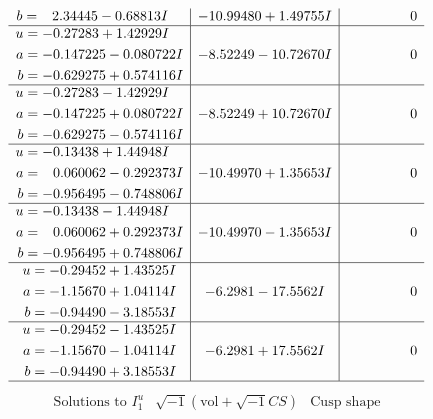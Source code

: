 \documentclass[1p]{elsarticle_modified}
\theoremstyle{definition}
\newcommand{\I}{\sqrt{-1}}
\begin{document}
$$\begin{array}{c|c|c}
\begin{aligned}
b &= \phantom{-}2.34445 - 0.68813 I\end{aligned}
 & -10.99480 + 1.49755 I & \phantom{-0.000000 } 0 \\ \hline\begin{aligned}
u &= -0.27283 + 1.42929 I \\
a &= -0.147225 - 0.080722 I \\
b &= -0.629275 + 0.574116 I\end{aligned}
 & -8.52249 - 10.72670 I & \phantom{-0.000000 } 0 \\ \hline\begin{aligned}
u &= -0.27283 - 1.42929 I \\
a &= -0.147225 + 0.080722 I \\
b &= -0.629275 - 0.574116 I\end{aligned}
 & -8.52249 + 10.72670 I & \phantom{-0.000000 } 0 \\ \hline\begin{aligned}
u &= -0.13438 + 1.44948 I \\
a &= \phantom{-}0.060062 - 0.292373 I \\
b &= -0.956495 - 0.748806 I\end{aligned}
 & -10.49970 + 1.35653 I & \phantom{-0.000000 } 0 \\ \hline\begin{aligned}
u &= -0.13438 - 1.44948 I \\
a &= \phantom{-}0.060062 + 0.292373 I \\
b &= -0.956495 + 0.748806 I\end{aligned}
 & -10.49970 - 1.35653 I & \phantom{-0.000000 } 0 \\ \hline\begin{aligned}
u &= -0.29452 + 1.43525 I \\
a &= -1.15670 + 1.04114 I \\
b &= -0.94490 - 3.18553 I\end{aligned}
 & -6.2981 - 17.5562 I & \phantom{-0.000000 } 0 \\ \hline\begin{aligned}
u &= -0.29452 - 1.43525 I \\
a &= -1.15670 - 1.04114 I \\
b &= -0.94490 + 3.18553 I\end{aligned}
 & -6.2981 + 17.5562 I & \phantom{-0.000000 } 0\\
 \hline 
 \end{array}$$\newpage$$\begin{array}{c|c|c}  
\text{Solutions to }I^u_{1}& \I (\text{vol} + \sqrt{-1}CS) & \text{Cusp shape}\\

\end{array}$$
\end{document}
